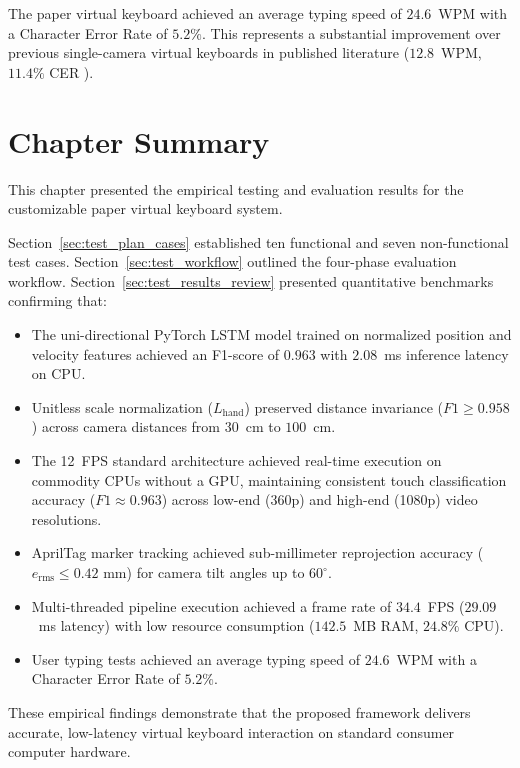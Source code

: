 The paper virtual keyboard achieved an average typing speed of $24.6$~WPM with a Character Error Rate of $5.2\%$. This represents a substantial improvement over previous single-camera virtual keyboards in published literature ($12.8$~WPM, $11.4\%$ CER \cite{Ji2018Local}).

\section{Chapter Summary}
\label{sec:test_summary}
This chapter presented the empirical testing and evaluation results for the customizable paper virtual keyboard system.

Section~\ref{sec:test_plan_cases} established ten functional and seven non-functional test cases. Section~\ref{sec:test_workflow} outlined the four-phase evaluation workflow. Section~\ref{sec:test_results_review} presented quantitative benchmarks confirming that:
\begin{itemize}
    \item The uni-directional PyTorch LSTM model trained on normalized position and velocity features achieved an F1-score of $0.963$ with $2.08$~ms inference latency on CPU.
    \item Unitless scale normalization ($L_{\text{hand}}$) preserved distance invariance ($F1 \ge 0.958$) across camera distances from $30$~cm to $100$~cm.
    \item The 12~FPS standard architecture achieved real-time execution on commodity CPUs without a GPU, maintaining consistent touch classification accuracy ($F1 \approx 0.963$) across low-end (360p) and high-end (1080p) video resolutions.
    \item AprilTag marker tracking achieved sub-millimeter reprojection accuracy ($e_{\text{rms}} \le 0.42\text{ mm}$) for camera tilt angles up to $60^\circ$.
    \item Multi-threaded pipeline execution achieved a frame rate of $34.4$~FPS ($29.09$~ms latency) with low resource consumption ($142.5$~MB RAM, $24.8\%$ CPU).
    \item User typing tests achieved an average typing speed of $24.6$~WPM with a Character Error Rate of $5.2\%$.
\end{itemize}

These empirical findings demonstrate that the proposed framework delivers accurate, low-latency virtual keyboard interaction on standard consumer computer hardware.
